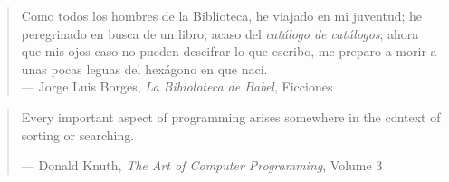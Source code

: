 \newpage
\thispagestyle{empty}
\vspace*{5cm}
\hfill
\begin{minipage}{0.70\textwidth}
\begin{quote}
Como todos los hombres de la Biblioteca, he viajado en mi juventud; he peregrinado en busca de un libro, acaso del \emph{catálogo de catálogos}; ahora que mis ojos caso no pueden descifrar lo que escribo, me preparo a morir a unas pocas leguas del hexágono en que nací.\\
--- Jorge Luis Borges, \textit{La Bibioloteca de Babel}, Ficciones
\end{quote}
\hspace*{2cm}

\begin{quote}
Every important aspect of programming arises somewhere in the context of sorting or searching.

--- Donald Knuth, \textit{The Art of Computer Programming}, Volume 3
\end{quote}
\end{minipage}

\thispagestyle{empty}
\maketitle


